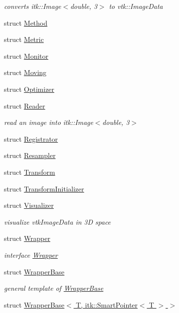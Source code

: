 \begin{DoxyCompactItemize}
\begin{DoxyCompactList}\small\item\em converts itk\+::\+Image$<$double, 3$>$ to vtk\+::\+Image\+Data \end{DoxyCompactList}\item 
struct \hyperlink{structreg_1_1_method}{Method}
\item 
struct \hyperlink{structreg_1_1_metric}{Metric}
\item 
struct \hyperlink{structreg_1_1_monitor}{Monitor}
\item 
struct \hyperlink{structreg_1_1_moving}{Moving}
\item 
struct \hyperlink{structreg_1_1_optimizer}{Optimizer}
\item 
struct \hyperlink{structreg_1_1_reader}{Reader}
\begin{DoxyCompactList}\small\item\em read an image into itk\+::\+Image$<$double, 3$>$ \end{DoxyCompactList}\item 
struct \hyperlink{structreg_1_1_registrator}{Registrator}
\item 
struct \hyperlink{structreg_1_1_resampler}{Resampler}
\item 
struct \hyperlink{structreg_1_1_transform}{Transform}
\item 
struct \hyperlink{structreg_1_1_transform_initializer}{Transform\+Initializer}
\item 
struct \hyperlink{structreg_1_1_visualizer}{Visualizer}
\begin{DoxyCompactList}\small\item\em visualize vtk\+Image\+Data in 3D space \end{DoxyCompactList}\item 
struct \hyperlink{structreg_1_1_wrapper}{Wrapper}
\begin{DoxyCompactList}\small\item\em interface \hyperlink{structreg_1_1_wrapper}{Wrapper} \end{DoxyCompactList}\item 
struct \hyperlink{structreg_1_1_wrapper_base}{Wrapper\+Base}
\begin{DoxyCompactList}\small\item\em general template of \hyperlink{structreg_1_1_wrapper_base}{Wrapper\+Base} \end{DoxyCompactList}\item 
struct \hyperlink{structreg_1_1_wrapper_base_3_01_t_00_01itk_1_1_smart_pointer_3_01_t_01_4_01_4}{Wrapper\+Base$<$ T, itk\+::\+Smart\+Pointer$<$ T $>$ $>$}

\end{DoxyCompactItemize}
